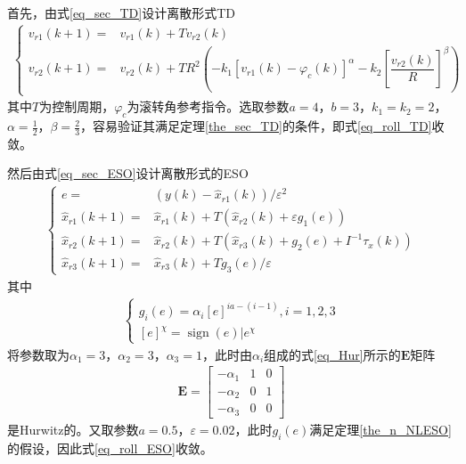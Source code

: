 首先，由式\eqref{eq_sec_TD}设计离散形式TD
\begin{align}
{\left\{\begin{aligned}
	v_{r1}(k+1)=& v_{r1}(k)+T v_{r2}(k) \\
	v_{r2}(k+1)=& v_{r2}(k)+TR^{2}\left(-k_{1}\left[v_{r1}(k)-\varphi_c(k)\right]^{\alpha}-k_{2}\left[\dfrac{v_{r2}(k)}{R}\right]^{\beta}\right)
	\end{aligned}\right.}	\label{eq_roll_TD}	
\end{align}
其中$ T $为控制周期，$ \varphi_c $为滚转角参考指令。选取参数$a=4$，$b=3$，$ k_{1}=k_{2}=2$，$\alpha=\frac{1}{2}$，$ \beta=\frac{2}{3}$，容易验证其满足定理\ref{the_sec_TD}的条件，即式\eqref{eq_roll_TD}收敛。

然后由式\eqref{eq_sec_ESO}设计离散形式的ESO
\begin{align}
{\left\{\begin{aligned}
	e=&\left(y(k)-\hat{x}_{r1}(k)\right) / \varepsilon^{2} \\
	\hat{x}_{r1}(k+1)=& \hat{x}_{r1}(k)+T\left(\hat{x}_{r2}(k)+\varepsilon g_{1}(e)\right) \\
	\hat{x}_{r2}(k+1)=& \hat{x}_{r2}(k)+T\left(\hat{x}_{r3}(k)+g_{2}(e)+I^{-1} \tau_{x}(k)\right) \\
	\hat{x}_{r3}(k+1)=& \hat{x}_{r3}(k)+T g_{3}(e) / \varepsilon
	\end{aligned}\right.}	\label{eq_roll_ESO}
\end{align}
其中
\begin{align}\left\{\begin{array}{l}
g_{i}(e)=\alpha_{i}[e]^{i a-(i-1)}, i=1,2,3 \\
{[e]^{\chi} = \operatorname{sign}(e) | e^{\chi}}
\end{array}\right.
\end{align}
将参数取为$ \alpha_{1}=3 $，$ \alpha_{2}=3 $，$ \alpha_{3}=1 $，此时由$ \alpha_{i} $组成的式\eqref{eq_Hur}所示的$ \bm{E} $矩阵
\begin{align}
\bm{E}=\begin{bmatrix}
-\alpha_{1} & 1 & 0  \\
-\alpha_{2} & 0 & 1  \\
-\alpha_{3} & 0 & 0 
\end{bmatrix}	\label{eq_roll_Hur}
\end{align}
是Hurwitz的。又取参数$ a=0.5 $，$ \varepsilon=0.02 $，此时$ g_{i}(e) $满足定理\ref{the_n_NLESO}的假设，因此式\eqref{eq_roll_ESO}收敛。

